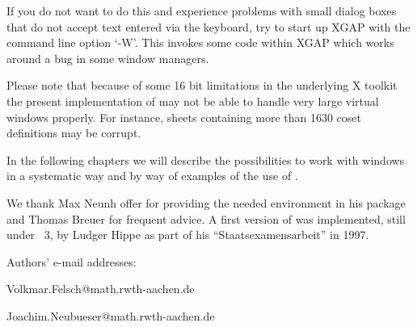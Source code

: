 If you do not want to do this and experience problems with small
dialog boxes that do not accept text entered via the keyboard, try to
start up XGAP with the command line option `-W'. This invokes some
code within XGAP which works around a bug in some window managers.

Please note that because of some 16 bit limitations in the underlying
X toolkit the present implementation of {\XGAP} may not be able to
handle very large virtual windows properly. For instance, sheets
containing more than 1630 coset definitions may be corrupt.

In the following chapters we will describe the possibilities to work
with windows in a systematic way and by way of examples of the use of
{\ITC}.



We thank Max Neunh{ o}ffer for providing the needed
environment in his package {\XGAP} and Thomas Breuer for frequent
advice. A first version of {\ITC} was implemented, still under
{\GAP}~3, by Ludger Hippe as part of his ``Staatsexamensarbeit'' in
1997.

Authors' e-mail addresses:

\beginlist

\item{}
  Volkmar.Felsch@math.rwth-aachen.de

\item{}
  Joachim.Neubueser@math.rwth-aachen.de

\endlist



